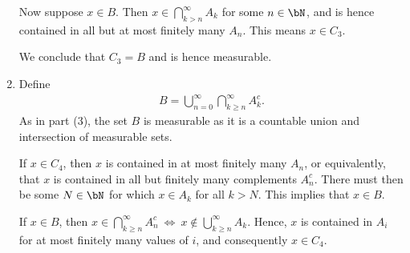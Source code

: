 \begin{homework}[e]
\begin{prf}
\begin{enumerate}[(1)]
				Now suppose $x \in B$. Then $x \in \bigcap_{k > n}^\infty A_k$ for some $n \in \bN$, and is hence contained in all but at most finitely many $A_n$. This means $x \in C_3$.

				We conclude that $C_3 = B$ and is hence measurable.

			\item Define
				\begin{align*}
					B = \bigcup_{n = 0}^\infty \bigcap_{k \geq n}^\infty A_k^c.
				\end{align*}
				As in part (3), the set $B$ is measurable as it is a countable union and intersection of measurable sets.

				If $x \in C_4$, then $x$ is contained in at most finitely many $A_n$, or equivalently, that $x$ is contained in all but finitely many complements $A_n^c$. There must then be some $N \in \bN$ for which $x \in A_k$ for all $k> N$. This implies that $x \in B$.

				If $x \in B$, then $x \in \bigcap_{k \geq n}^\infty A_n^c~\iff~ x \not\in \bigcup_{k \geq n}^\infty A_k$. Hence, $x$ is contained in $A_i$ for at most finitely many values of $i$, and consequently $x \in C_4$.


\end{enumerate}
\end{prf}
\end{homework}
